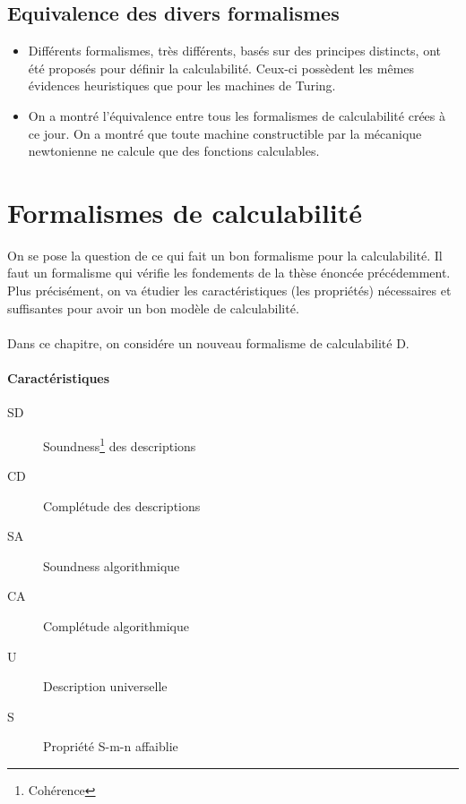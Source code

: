 \subsection{Equivalence des divers formalismes}
\begin{itemize}
\item Différents formalismes, très différents, basés sur des principes distincts, ont été proposés pour définir la calculabilité. Ceux-ci possèdent les mêmes évidences heuristiques que pour les machines de Turing. 
\item On a montré l'équivalence  entre tous les formalismes de calculabilité crées à ce jour. On a montré que toute machine constructible par la mécanique newtonienne ne calcule que des fonctions calculables.

\end{itemize}



\section{Formalismes de calculabilité}
\label{sub:formalismes_de_la_calculabilit_}

On se pose la question de ce qui fait un bon formalisme pour la
calculabilité. Il faut un formalisme qui vérifie les fondements de la
thèse énoncée précédemment. Plus précisément, on va étudier les caractéristiques (les propriétés)
nécessaires et suffisantes pour avoir un bon modèle de calculabilité.

\paragraph{} Dans ce chapitre, on considére un nouveau formalisme de calculabilité D.

\begin{samepage}
\paragraph{Caractéristiques}
\begin{description}
	\item[SD] Soundness\footnote{Cohérence} des descriptions
	\item[CD] Complétude des descriptions
	\item[SA] Soundness algorithmique
	\item[CA] Complétude algorithmique
	\item[U] Description universelle\nopagebreak
	\item[S] Propriété S-m-n affaiblie
\end{description}
\end{samepage}

